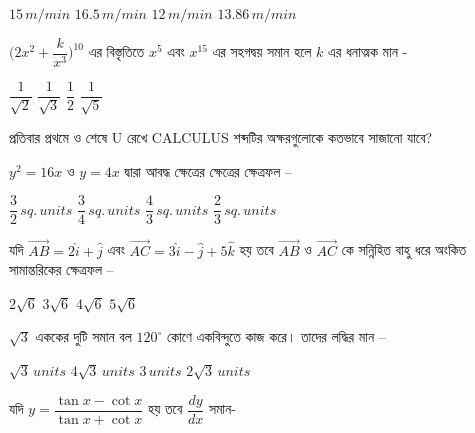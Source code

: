 \documentclass[addpoints]{exam}
\begin{document}
\begin{questions}
\begin{oneparchoices}
\choice $ 15\,m/min $
\choice $ 16.5\,m/min $
\choice $ 12\,m/min $
\choice $ 13.86\,m/min $

\end{oneparchoices}

\question  $ \Big(2x^{2}+\dfrac{k}{x^{3}}\Big)^{10} $ এর বিস্তৃতিতে $ x^{5} $ এবং $ x^{15} $ এর সহগদ্বয় সমান হলে $ k $ এর ধনাত্মক মান -

\begin{oneparchoices}
\choice $ \dfrac{1}{\sqrt{2}} $
\choice  $ \dfrac{1}{\sqrt{3}} $
\choice $ \dfrac{1}{2} $
\choice $ \dfrac{1}{\sqrt{5}} $

\end{oneparchoices}


\question প্রতিবার প্রথমে ও শেষে U রেখে CALCULUS শব্দটির অক্ষরগুলোকে কতভাবে সাজানো যাবে?

\begin{oneparchoices}
\end{oneparchoices}

\question  $ y^{2}=16x $ ও $ y=4x $ দ্বারা আবদ্ধ ক্ষেত্রের ক্ষেত্রের ক্ষেত্রফল – 

\begin{oneparchoices}
\choice $ \dfrac{3}{2}\, sq.\, units $
\choice $ \dfrac{3}{4}\, sq.\, units $
\choice $ \dfrac{4}{3}\, sq.\, units $
\choice $ \dfrac{2}{3}\, sq.\, units $
\end{oneparchoices}

\question যদি $ \vec{AB} = 2\hat{i}+\hat{j} $ এবং $ \vec{AC} =3\hat{i}-\hat{j}+5\hat{k} $ হয় তবে $ \vec{AB} $ ও $ \vec{AC} $ কে সন্নিহিত বাহু ধরে অংকিত সামান্তরিকের ক্ষেত্রফল – 

\begin{oneparchoices}
\choice $ 2\sqrt{6} $
\choice $ 3\sqrt{6} $
\choice $ 4\sqrt{6} $
\choice  $ 5\sqrt{6} $
\end{oneparchoices}

\question $ \sqrt{3} $ এককের দুটি সমান বল $ 120^{\circ} $ কোণে একবিন্দুতে কাজ করে। তাদের লদ্ধির মান – 

\begin{oneparchoices}
\choice $ \sqrt{3}\, units $
\choice $ 4\sqrt{3}\, units $
\choice $ 3\, units $
\choice $2 \sqrt{3}\, units $
\end{oneparchoices}

\question   যদি $ y =\dfrac{\tan x-\cot x}{\tan x +\cot x} $ হয় তবে $ \dfrac{dy}{dx} $ সমান-


\end{questions}
\end{document}
